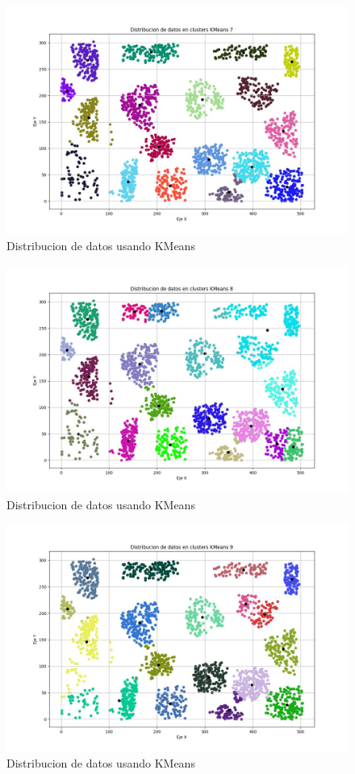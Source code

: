 \documentclass[conference]{IEEEtran}
\begin{document}
\begin{figure}[htbp]
    \centering
    \includegraphics[width=1\linewidth]{figures/kmeans7.jpeg} %
    \caption{Distribucion de datos usando KMeans}
    \label{fig:kmeans7}
\end{figure}
\begin{figure}[htbp]
    \centering
    \includegraphics[width=1\linewidth]{figures/kmeans8.jpeg} %
    \caption{Distribucion de datos usando KMeans}
    \label{fig:kmeans8}
\end{figure}
\begin{figure}[htbp]
    \centering
    \includegraphics[width=1\linewidth]{figures/kmeans9.jpeg} %
    \caption{Distribucion de datos usando KMeans}
    \label{fig:kmeans9}
\end{figure}
\end{document}
